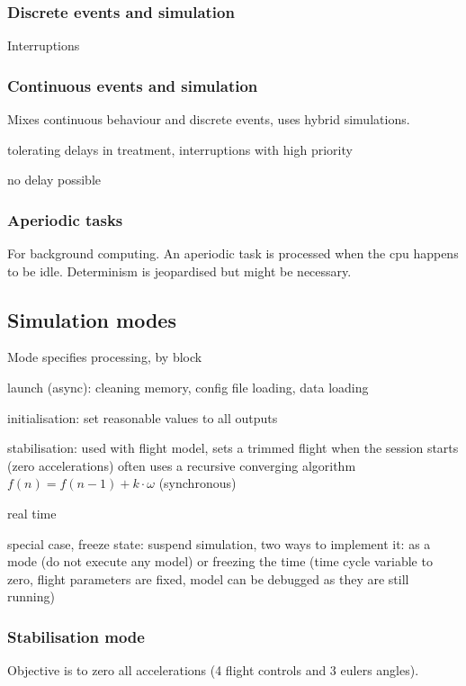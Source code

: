 \documentclass[10pt]{article}
\theoremstyle{plain}
\theoremstyle{definition}
\theoremstyle{remark}
\begin{document}
\subsubsection{Discrete events and simulation}
Interruptions

\subsubsection{Continuous events and simulation}
Mixes continuous behaviour and discrete events, uses hybrid simulations.
\begin{compactitem}
	\item tolerating delays in treatment, interruptions with high priority
	\item no delay possible
\end{compactitem}

\subsubsection{Aperiodic tasks}
For background computing. An aperiodic task is processed when the cpu happens
to be idle. Determinism is jeopardised but might be necessary.

\subsection{Simulation modes}
Mode specifies processing, by block
\begin{compactitem}
	\item launch (async): cleaning memory, config file loading, data loading
	\item initialisation: set reasonable values to all outputs
	\item stabilisation: used with flight model, sets a trimmed flight when
		the session starts (zero accelerations) often uses a recursive
		converging algorithm \( f(n) = f(n-1) + k\cdot \omega \) (synchronous)
	\item real time
	\item special case, freeze state: suspend simulation, two ways to implement
		it: as a mode (do not execute any model) or freezing the time (time
		cycle variable to zero, flight parameters are fixed, model can be
		debugged as they are still running)
\end{compactitem}

\subsubsection{Stabilisation mode}
Objective is to zero all accelerations (4 flight controls and 3 eulers angles).
\end{document}

